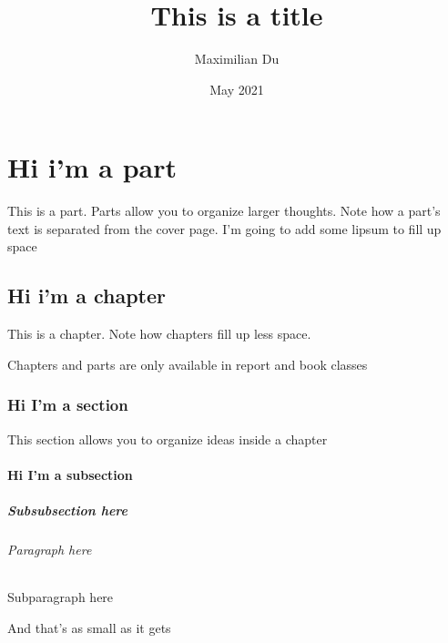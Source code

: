 \documentclass[12pt]{report}
\title{This is a title}
\author{Maximilian Du}
\date{May 2021}
\begin{document}

\maketitle

\tableofcontents %

\part{Hi i'm a part}
This is a part. Parts allow you to organize larger thoughts. Note how a part's text is separated from the cover page. I'm going to add some lipsum to fill up space 

\lipsum[1]

\chapter{Hi i'm a chapter}
This is a chapter. Note how chapters fill up less space. 

Chapters and parts are only available in report and book classes 

\lipsum[1]

\section{Hi I'm a section}
This section allows you to organize ideas inside a chapter 

\lipsum[1]

\subsection{Hi I'm a subsection}
\lipsum[1]

\subsubsection{Subsubsection here}
\lipsum[1]

\paragraph{Paragraph here}
\lipsum[1]


\subparagraph{Subparagraph here}
\lipsum[1]

And that's as small as it gets 
\end{document}
